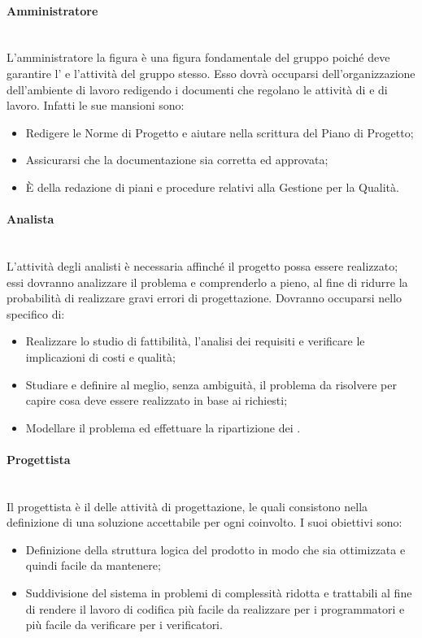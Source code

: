 \paragraph{Amministratore}\mbox{}\\[0.4cm]
L’amministratore la figura è una figura fondamentale del gruppo poiché deve garantire l’ e l’attività del gruppo stesso. Esso dovrà occuparsi dell’organizzazione dell’ambiente di lavoro redigendo i documenti che regolano le attività di  e di lavoro. Infatti le sue mansioni sono:
\begin{itemize}
    \item Redigere le Norme di Progetto e aiutare nella scrittura del Piano di Progetto;
    \item Assicurarsi che la documentazione sia corretta ed approvata;
    \item È  della redazione di piani e procedure relativi alla Gestione per la Qualità.
\end{itemize}

\paragraph{Analista}\mbox{}\\[0.4cm]
L’attività degli analisti è necessaria affinché il progetto possa essere realizzato; essi dovranno analizzare il problema e comprenderlo a pieno, al fine di ridurre la probabilità di realizzare gravi errori di progettazione. Dovranno occuparsi nello specifico di:
\begin{itemize}
    \item Realizzare  lo studio di fattibilità, l’analisi dei requisiti e verificare le implicazioni di costi e qualità;
    \item Studiare e definire al meglio, senza ambiguità, il problema da risolvere per capire cosa deve essere realizzato in base ai  richiesti;
    \item Modellare il problema ed effettuare la ripartizione dei .
\end{itemize}

\paragraph{Progettista}\mbox{}\\[0.4cm]
Il progettista è il  delle attività di progettazione, le quali consistono nella definizione di una soluzione accettabile per ogni  coinvolto. I suoi obiettivi sono:
\begin{itemize}

    \item Definizione della struttura logica del prodotto in modo che sia ottimizzata e quindi facile da mantenere;
    \item Suddivisione del sistema in problemi di complessità ridotta e trattabili al fine di rendere il lavoro di codifica più facile da realizzare per i programmatori e più facile da verificare per i verificatori.
\end{itemize}

